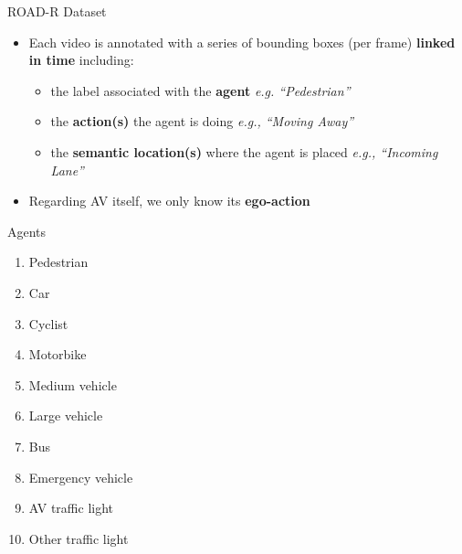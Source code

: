 \documentclass[10pt, aspectratio=169]{beamer}
\begin{document}
\begin{frame}{ROAD-R Dataset}
    \begin{itemize}
        \setlength{\itemsep}{13pt}
        \item Each video is annotated with a \textcolor{umBlueLighter}{series of bounding boxes} (per frame) \textbf{linked in time} including:
        \vspace{4pt}
        \begin{itemize}
            \setlength{\itemsep}{4pt}
            \item the label associated with the \textbf{agent} \textit{e.g. “Pedestrian”}
            \item the \textbf{action(s)} the agent is doing \textit{e.g., “Moving Away”} 
            \item the \textbf{semantic location(s)} where the agent is placed \textit{e.g., “Incoming Lane”}
        \end{itemize}
        \item Regarding AV itself, we only know its \textbf{ego-action}
    \end{itemize}
\end{frame}


\begin{frame}{Agents}
  \begin{multicols}{2}
        \begin{enumerate}
            \setlength\itemsep{1em}
            \item Pedestrian
            \item Car
            \item Cyclist
            \item Motorbike
            \item Medium vehicle
            \item Large vehicle
            \item Bus
            \item Emergency vehicle
            \item AV traffic light 
            \item Other traffic light
        \end{enumerate}
    \end{multicols}
\end{frame}
\end{document}
